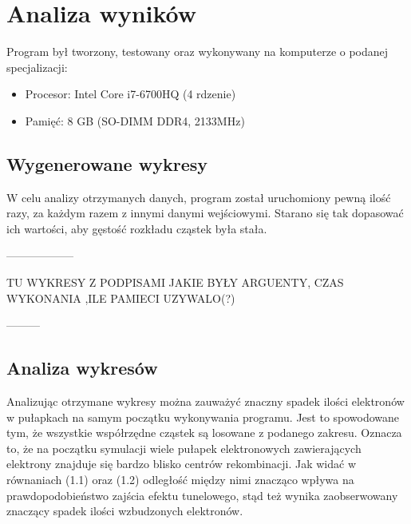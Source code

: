\chapter{Analiza wyników}

Program był tworzony, testowany oraz wykonywany na komputerze o podanej specjalizacji:
\begin{itemize}
\item Procesor: Intel Core i7-6700HQ (4 rdzenie)
\item Pamięć: 8 GB (SO-DIMM DDR4, 2133MHz)
\end{itemize}

\section{Wygenerowane wykresy}
W celu analizy otrzymanych danych, program został uruchomiony pewną ilość razy, za każdym razem z innymi danymi wejściowymi. Starano się tak dopasować ich wartości, aby gęstość rozkładu cząstek była stała.

------------------

TU WYKRESY Z PODPISAMI JAKIE BYŁY ARGUENTY, CZAS WYKONANIA ,ILE PAMIECI UZYWALO(?)

---------
\section{Analiza wykresów}
Analizując otrzymane wykresy można zauważyć znaczny spadek ilości elektronów w pułapkach na samym początku wykonywania programu. Jest to spowodowane tym, że wszystkie współrzędne cząstek są losowane z podanego zakresu. Oznacza to, że na początku symulacji wiele pułapek elektronowych zawierających elektrony znajduje się bardzo blisko centrów rekombinacji. Jak widać w równaniach (1.1) oraz (1.2) odległość między nimi znacząco wpływa na prawdopodobieństwo zajścia efektu tunelowego, stąd też wynika zaobserwowany znaczący spadek ilości wzbudzonych elektronów.
